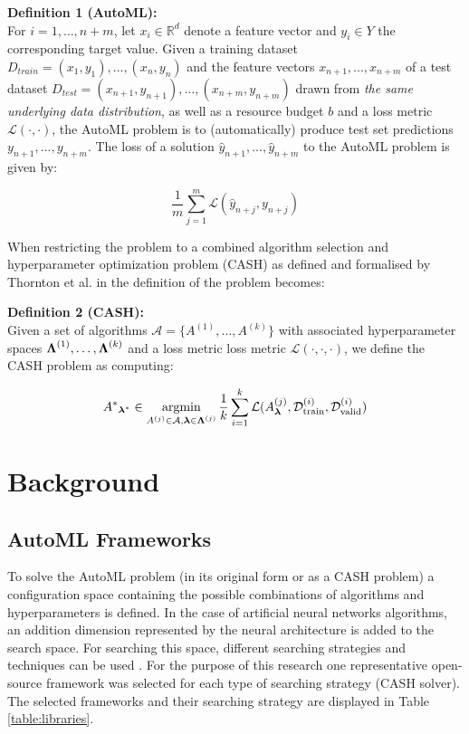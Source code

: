\documentclass{sig-alternate-br}
\begin{document}
\textbf{Definition 1 (AutoML):} 
\\ For $i = 1, \dots , n + m$, let $x_i \in \mathbb{R}^d$ denote a feature vector and $y_i \in Y$ the corresponding target value. Given a training dataset $D_{train} = {(x_1, y_1),\dots , (x_{n}, y_{n})}$ and
the feature vectors $x_{n+1}, . . . , x_{n+m}$ of a test dataset $D_{test} = {(x_{n+1}, y_{n+1}), \dots ,(x_{n+m}, y_{n+m})}$
drawn from \textit{the same underlying data distribution}, as well as a resource budget $b$ and a loss metric
$\mathcal{L}(\cdot, \cdot)$, the AutoML problem is to (automatically) produce test set predictions $y_{n+1}, . . . , y_{n+m}$. The
loss of a solution $\hat{y}_{n+1}, . . . , \hat{y}_{n+m}$ to the AutoML problem is given by:

\begin{equation}
   \frac{1}{m} \sum_{j=1}^{m} \mathcal{L}( \hat{y}_{n+j},  {y}_{n+j})
\end{equation}

When restricting the problem to a combined algorithm selection and hyperparameter optimization problem (CASH) as defined and formalised by Thornton et al. in \cite{thornton2013autoweka} the definition of the problem becomes:

\textbf{Definition 2 (CASH):}
\\ Given a set of algorithms $\mathcal{A} = \{A^{(1)}, \dots, A^{(k)}\}$ with associated hyperparameter spaces ${\boldsymbol{\Lambda}}^{(1)}, \dots, {\boldsymbol{\Lambda}}^{(k)}$ and a loss metric loss metric $\mathcal{L}(\cdot, \cdot, \cdot)$, we define the CASH problem as computing:

\begin{equation}
{A^*}_{\vlambda^*} \in \argmin_{A^{(j)} \in \mathcal{A}, \vlambda \in \vLambda^{(j)}} \frac{1}{k}  \sum_{i=1}^{k} \mathcal{L}(A^{(j)}_\vlambda, \mathcal{D}_{\text{train}}^{(i)}, \mathcal{D}_{\text{valid}}^{(i)})
\end{equation}

\section{Background}

\subsection{AutoML Frameworks}
To solve the AutoML problem (in its original form or as a CASH problem) a configuration space containing the possible combinations of algorithms and hyperparameters is defined. In the case of artificial neural networks algorithms, an addition dimension represented by the neural architecture is added to the search space. For searching this space, different searching strategies and techniques can be used \cite{truong2019towards}. For the purpose of this research one representative open-source framework \cite{gijsbers2019open} was selected for each type of searching strategy (CASH solver). The selected frameworks and their searching strategy are displayed in Table \ref{table:libraries}.
\end{document}
